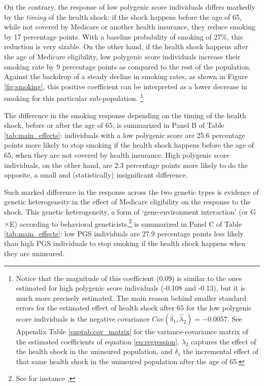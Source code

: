 \documentclass[11pt]{article}
\begin{document}
On the contrary, the response of low polygenic score individuals differs markedly by the \textit{timing} of the health shock: if the shock happens before the age of 65, while not covered by Medicare or another health insurance, they reduce smoking by 17 percentage points.
With a baseline probability of smoking of 27\%, this reduction is very sizable.
On the other hand, if the health shock happens after the age of Medicare eligibility, low polygenic score individuals increase their smoking rate by 9 percentage points as compared to the rest of the population.
Against the backdrop of a steady decline in smoking rates, as shown in Figure \ref{fig:smoking}, this positive coefficient can be interpreted as a lower decrease in smoking for this particular sub-population.%
\footnote{Notice that the magnitude of this coefficient (0.09) is similar to the ones estimated for high polygenic score individuals (-0.108 and -0.13), but it is much more precisely estimated. The main reason behind smaller standard errors for the estimated effect of health shock after 65 for the low polygenic score individuals is the negative covariance $Cov(\hat{\delta}_1,\hat{\lambda}_2) =  -0.0057$. See Appendix Table \ref{suptab:cov_matrix} for the variance-covariance matrix of the estimated coefficients of equation \ref{eq:regression}. $\lambda_2$ captures the effect of the health shock in the uninsured population, and $\delta_1$ the incremental effect of that same health shock in the uninsured population after the age of 65.}

The difference in the smoking response depending on the timing of the health shock, before or after the age of 65, is summarized in Panel B of Table \ref{tab:main_effects}: individuals with a low polygenic score are 25.6 percentage points more likely to stop smoking if the health shock happens before the age of 65, when they are not covered by health insurance.
High polygenic score individuals, on the other hand, are 2.3 percentage points more likely to do the opposite, a small and (statistically) insignificant difference.

Such marked difference in the response across the two genetic types is evidence of genetic heterogeneity in the effect of Medicare eligibility on the response to the shock.
This genetic heterogeneity, a form of `gene-environment interaction' (or G$\times$E) according to behavioral geneticists,\footnote{See for instance \cite{Haldane1946,Anastasi1958,Plomin1977,Ottman1990,Plomin1990}.} is summarized in Panel C of Table \ref{tab:main_effects}: low PGS individuals are 27.9 percentage points less likely than high PGS individuals to stop smoking if the health shock happens when they are uninsured.
\end{document}
